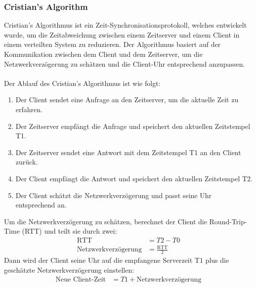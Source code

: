 \documentclass[../vs-script-first-v01.tex]{subfiles}
\begin{document}
\subsubsection{Cristian's Algorithm}
Cristian's Algorithmus ist ein Zeit-Synchronisationsprotokoll, welches entwickelt wurde, um die Zeitabweichung zwischen einem Zeitserver und einem Client in einem verteilten System zu reduzieren. Der Algorithmus basiert auf der Kommunikation zwischen dem Client und dem Zeitserver, um die Netzwerkverzögerung zu schätzen und die Client-Uhr entsprechend anzupassen.
\\\\
Der Ablauf des Cristian's Algorithmus ist wie folgt:
\begin{enumerate}
\item Der Client sendet eine Anfrage an den Zeitserver, um die aktuelle Zeit zu erfahren.
\item Der Zeitserver empfängt die Anfrage und speichert den aktuellen Zeitstempel T1.
\item Der Zeitserver sendet eine Antwort mit dem Zeitstempel T1 an den Client zurück.
\item Der Client empfängt die Antwort und speichert den aktuellen Zeitstempel T2.
\item Der Client schätzt die Netzwerkverzögerung und passt seine Uhr entsprechend an.
\end{enumerate}
Um die Netzwerkverzögerung zu schätzen, berechnet der Client die Round-Trip-Time (RTT) und teilt sie durch zwei:
\begin{align*}
\text{RTT} &= T2 - T0 \\
\text{Netzwerkverzögerung} &= \frac{\text{RTT}}{2}
\end{align*}
Dann wird der Client seine Uhr auf die empfangene Serverzeit T1 plus die geschätzte Netzwerkverzögerung einstellen:
\begin{align*}
\text{Neue Client-Zeit} &= T1 + \text{Netzwerkverzögerung}
\end{align*}
\end{document}

